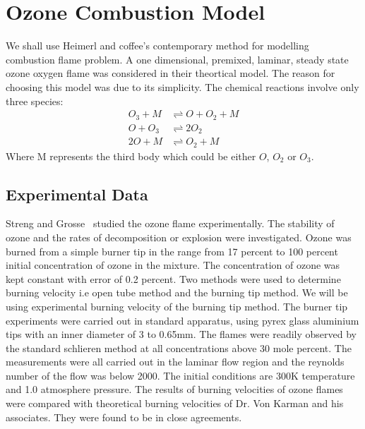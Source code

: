  \section{Ozone Combustion Model} \label{sec:ozone-data}
We shall use Heimerl and coffee's\cite{Heimerl} contemporary method
for modelling combustion flame problem. A one dimensional, premixed,
laminar, steady state ozone oxygen flame was considered in their
theortical model. The reason for choosing this model was due to its
simplicity. The chemical reactions involve only three species:
%
\begin{equation}\label{eq:ozone-mech}
\begin{aligned}
  O_3 + M &\rightleftharpoons O + O_2 + M\\
  O + O_3 &\rightleftharpoons 2O_2\\
  2O + M &\rightleftharpoons O_2 + M
\end{aligned}
\end{equation}
%
Where M represents the third body which could be either $O$,
$O_2$ or $O_3$.



\subsection{Experimental Data}

Streng and Grosse~\cite{Streng} studied the ozone
flame experimentally. The stability of ozone and the rates of
decomposition or explosion were investigated.%
Ozone was burned from a simple burner tip in the
range from 17 percent to 100 percent initial concentration of ozone in
the mixture.
The concentration of ozone was kept constant with error of 0.2
percent. Two methods were used to determine burning velocity i.e open
tube method and the burning tip method. We will be using experimental
burning velocity of the burning tip method. The burner tip experiments
were carried out in standard apparatus, using pyrex glass aluminium
tips with an inner diameter of 3 to 0.65mm. The flames were readily
observed by the standard schlieren method at all concentrations above
30 mole percent. The measurements were all carried out in the laminar
flow region and the reynolds number of the flow was below 2000. The
initial conditions are 300K temperature and 1.0 atmosphere
pressure. The results of burning velocities of ozone flames were
compared with theoretical burning velocities of Dr. Von Karman and his
associates. They were found to be in close agreements.


